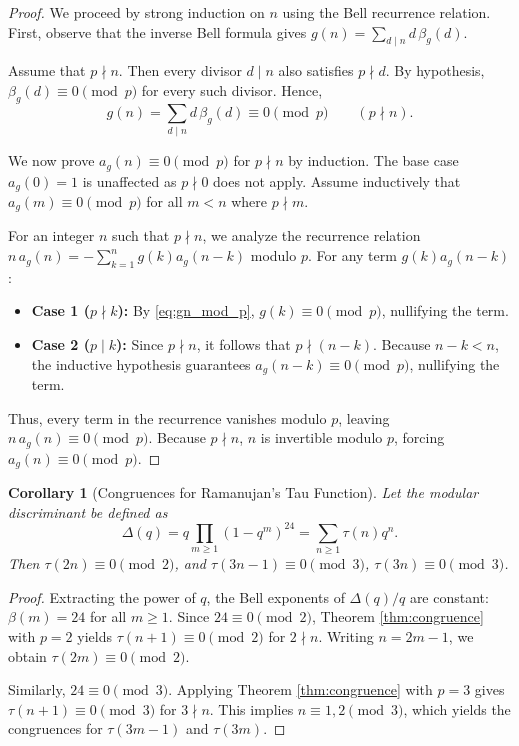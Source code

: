 \documentclass[11pt, a4paper]{article}
\newtheorem{corollary}[theorem]{Corollary}
\theoremstyle{remark}
\begin{document}
\begin{proof}
We proceed by strong induction on \(n\) using the Bell recurrence relation. First, observe that the inverse Bell formula gives \(g(n) = \sum_{d\mid n} d\,\beta_g(d)\).

Assume that \(p\nmid n\). Then every divisor \(d\mid n\) also satisfies \(p\nmid d\). By hypothesis, \(\beta_g(d)\equiv0\pmod p\) for every such divisor. Hence,
\begin{equation}
g(n)
=
\sum_{d\mid n} d\,\beta_g(d)
\equiv0\pmod p \qquad (p\nmid n).
\label{eq:gn_mod_p}
\end{equation}

We now prove \(a_g(n)\equiv0\pmod p\) for \(p\nmid n\) by induction. The base case \(a_g(0)=1\) is unaffected as \(p\nmid0\) does not apply. Assume inductively that \(a_g(m)\equiv0\pmod p\) for all \(m<n\) where \(p\nmid m\). 

For an integer \(n\) such that \(p\nmid n\), we analyze the recurrence relation \(n\,a_g(n) = -\sum_{k=1}^n g(k)a_g(n-k)\) modulo \(p\). For any term \(g(k)a_g(n-k)\):
\begin{itemize}
    \item \textbf{Case 1 (\(p\nmid k\)):} By \eqref{eq:gn_mod_p}, \(g(k)\equiv0\pmod p\), nullifying the term.
    \item \textbf{Case 2 (\(p\mid k\)):} Since \(p\nmid n\), it follows that \(p\nmid(n-k)\). Because \(n-k < n\), the inductive hypothesis guarantees \(a_g(n-k)\equiv0\pmod p\), nullifying the term.
\end{itemize}
Thus, every term in the recurrence vanishes modulo \(p\), leaving \(n\,a_g(n)\equiv0\pmod p\). Because \(p\nmid n\), \(n\) is invertible modulo \(p\), forcing \(a_g(n)\equiv0\pmod p\).
\end{proof}

\begin{corollary}[Congruences for Ramanujan's Tau Function]
Let the modular discriminant be defined as
\[
\Delta(q)
=
q\prod_{m\ge1}(1-q^m)^{24}
=
\sum_{n\ge1}\tau(n)q^n.
\]
Then \(\tau(2n)\equiv0\pmod2\), and \(\tau(3n-1)\equiv0\pmod3\), \(\tau(3n)\equiv0\pmod3\).
\end{corollary}

\begin{proof}
Extracting the power of \(q\), the Bell exponents of \(\Delta(q)/q\) are constant: \(\beta(m)=24\) for all \(m\ge1\). Since \(24\equiv0\pmod2\), Theorem \ref{thm:congruence} with \(p=2\) yields \(\tau(n+1)\equiv0\pmod2\) for \(2\nmid n\). Writing \(n=2m-1\), we obtain \(\tau(2m)\equiv0\pmod2\). 

Similarly, \(24\equiv0\pmod3\). Applying Theorem \ref{thm:congruence} with \(p=3\) gives \(\tau(n+1)\equiv0\pmod3\) for \(3\nmid n\). This implies \(n\equiv1,2\pmod3\), which yields the congruences for \(\tau(3m-1)\) and \(\tau(3m)\).
\end{proof}
\end{document}
